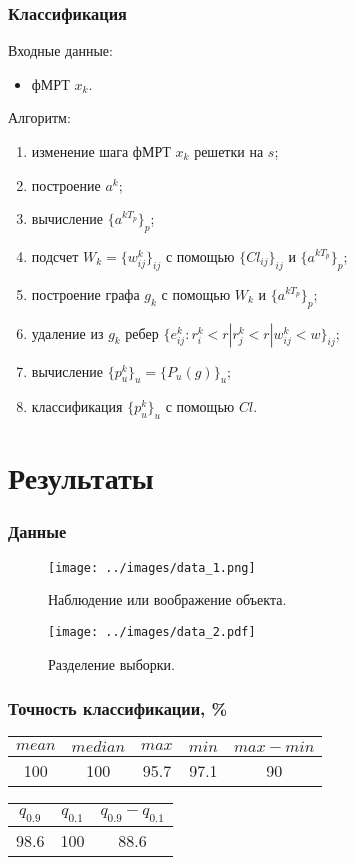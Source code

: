 \documentclass{beamer}
\begin{document}
	\begin{frame} 
		\frametitle{Классификация}
		Входные данные:
		\begin{itemize}
			\item фМРТ $x_k$.
		\end{itemize}
		Алгоритм: 
		\begin{enumerate}
			\item изменение шага фМРТ $x_k$ решетки на $s$;
			\item построение $a^k$;
			\item вычисление $\{a^{kT_p}\}_{p}$;
			\item подсчет $W_k = \{w^k_{ij}\}_{ij}$ с помощью $\{Cl_{ij}\}_{ij}$ и $\{a^{kT_p}\}_{p}$;
			\item построение графа $g_k$ с помощью $W_k$ и $\{a^{kT_p}\}_{p}$;
			\item удаление из $g_k$ ребер $\{e^k_{ij} : r^k_i < r | r^k_j < r | w^k_{ij} < w\}_{ij}$;
			\item вычисление $\{p^k_u\}_u = \{P_u(g)\}_u$;
			\item классификация $\{p^k_u\}_u$ с помощью $Cl$.
		\end{enumerate}
	\end{frame}
	
	\section{Результаты}
	\begin{frame} 
		\frametitle{Данные}
		\begin{figure}
			\begin{minipage}{4.5cm}
				\texttt{[image: ../images/data\_1.png]}
				\caption{Наблюдение или воображение объекта.} 
				\label{fg:12}
			\end{minipage}\hfill
			\begin{minipage}{5.5cm}
				\texttt{[image: ../images/data\_2.pdf]}
				\caption{Разделение выборки.}
				\label{fg:13}
			\end{minipage}	
		\end{figure}
	\end{frame}

	\begin{frame} 
		\frametitle{Точность классификации, \%}
		\vspace{1cm}
		
		\begin{table}
			\begin{tabular}{ccccc}
				$mean$ & $median$ & $max$ & $min$ & $max - min$ \\ \hline
				100 & 100 & 95.7 & 97.1 & 90
			\end{tabular}
		\end{table}
	
		\begin{table}
			\begin{tabular}{ccc}
				$q_{0.9}$ & $q_{0.1}$ & $q_{0.9} - q_{0.1}$ \\ \hline
				98.6 & 100 & 88.6
			\end{tabular}
		\end{table}
	
	
		

	\end{frame}
		
		
\end{document}
